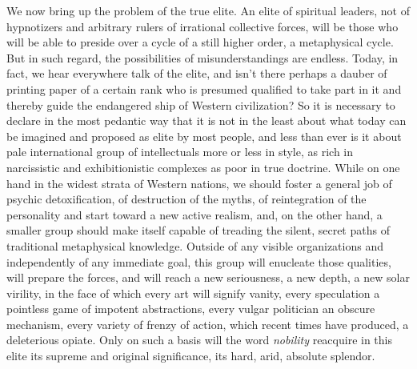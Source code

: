 We now bring up the problem of the true elite. An elite of spiritual leaders, not of hypnotizers and arbitrary rulers of irrational collective forces, will be those who will be able to preside over a cycle of a still higher order, a metaphysical cycle. But in such regard, the possibilities of misunderstandings are endless. Today, in fact, we hear everywhere talk of the elite, and isn't there perhaps a dauber of printing paper of a certain rank who is presumed qualified to take part in it and thereby guide the endangered ship of Western civilization? So it is necessary to declare in the most pedantic way that it is not in the least about what today can be imagined and proposed as elite by most people, and less than ever is it about pale international group of intellectuals more or less in style, as rich in narcissistic and exhibitionistic complexes as poor in true doctrine. While on one hand in the widest strata of Western nations, we should foster a general job of psychic detoxification, of destruction of the myths, of reintegration of the personality and start toward a new active realism, and, on the other hand, a smaller group should make itself capable of treading the silent, secret paths of traditional metaphysical knowledge. Outside of any visible organizations and independently of any immediate goal, this group will enucleate those qualities, will prepare the forces, and will reach a new seriousness, a new depth, a new solar virility, in the face of which every art will signify vanity, every speculation a pointless game of impotent abstractions, every vulgar politician an obscure mechanism, every variety of frenzy of action, which recent times have produced, a deleterious opiate. Only on such a basis will the word \emph{nobility} reacquire in this elite its supreme and original significance, its hard, arid, absolute splendor.

